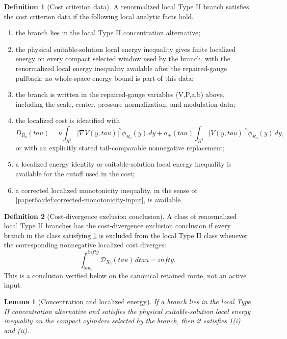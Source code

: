 \documentclass[11pt]{amsart}
\def\({}%
\def\){}%
\def\tilde#1{#1}%
\def\mathfrak#1{#1}%
\def\mathbb#1{#1}%
\def\tau{tau}%
\def\infty{infty}%
\theoremstyle{plain}
\newtheorem{lemma}[lemma]{Lemma}
\theoremstyle{definition}
\newtheorem{definition}[definition]{Definition}
\theoremstyle{remark}
\begin{document}
\begin{definition}[Cost criterion data]\label{paper6a:def:cost-hypotheses}
A renormalized local Type II branch satisfies the cost criterion data if the
following local analytic facts hold.
\begin{enumerate}[label=\textup{(\roman*)}]
\item the branch lies in the local Type II concentration alternative;
\item the physical suitable-solution local energy inequality gives finite
localized energy on every compact selected window used by the branch, with the
renormalized local energy inequality available after the repaired-gauge
pullback; no whole-space energy bound is part of this data;
\item the branch is written in the repaired-gauge variables
\((V,P,a,b)\) above, including the scale, center, pressure normalization, and
modulation data;
\item the localized cost is identified with
\[
  \tilde{\mathfrak D}_{R_0}(\tau)
  =
  \nu\int_{\mathbb R^3}|\nabla V(y,\tau)|^2\phi_{R_0}(y)\,dy
  +a_+(\tau)\int_{\mathbb R^3}|V(y,\tau)|^2\phi_{R_0}(y)\,dy,
\]
or with an explicitly stated tail-comparable nonnegative replacement;
\item a localized energy identity or suitable-solution local energy inequality
is available for the cutoff used in the cost;
\item a corrected localized monotonicity inequality, in the sense of
\cref{paper6a:def:corrected-monotonicity-input}, is available.
\end{enumerate}
\end{definition}

\begin{definition}[Cost-divergence exclusion conclusion]
\label{paper6a:def:cost-divergence-exclusion-conclusion}
A class of renormalized local Type II branches has the cost-divergence
exclusion conclusion if every branch in the class satisfying
\cref{paper6a:def:cost-hypotheses} is excluded from the local Type II class
whenever the corresponding nonnegative localized cost diverges:
\[
  \int_{\tau_0}^{\infty}\mathcal D_{R_0}(\tau)\,d\tau=\infty.
\]
This is a conclusion verified below on the canonical retained route, not an
active input.
\end{definition}

\begin{lemma}[Concentration and localized energy]\label{paper6a:lem:scale-energy-data}
If a branch lies in the local Type II concentration alternative and satisfies
the physical suitable-solution local energy inequality on the compact cylinders
selected by the branch, then it satisfies
\cref{paper6a:def:cost-hypotheses}\textup{(i)} and
\textup{(ii)}.
\end{lemma}
\end{document}
